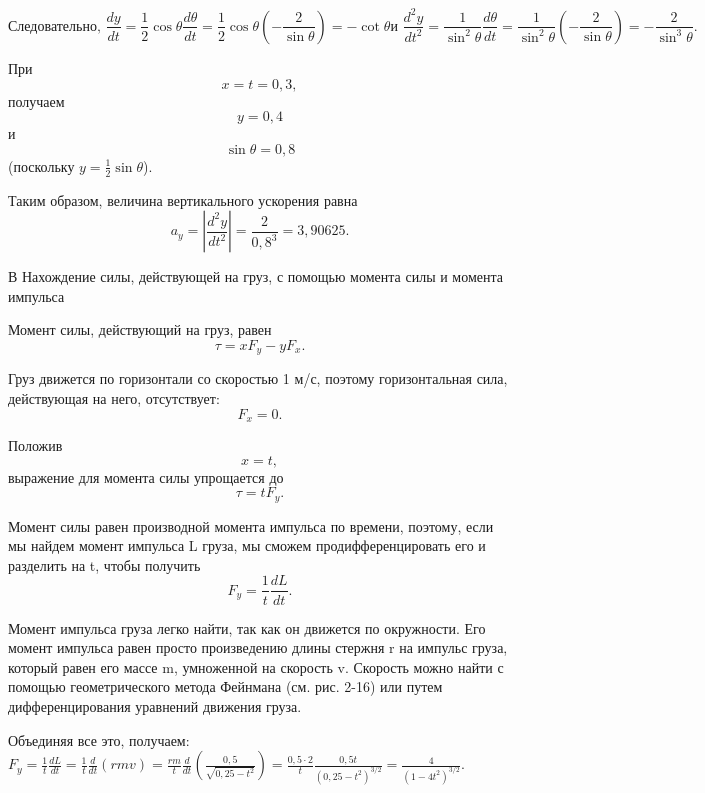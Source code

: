 \documentclass[10pt,oneside]{article}
\newcommand{\TipsRunning}[1]{\par\vspace{2bp}{\centering\footnotesize #1\par}\vspace{2bp}}
\begin{document}
\[\text{Следовательно, }\frac{dy}{dt} = \frac{1}{2} \cos\theta \frac{d\theta}{dt} = \frac{1}{2} \cos\theta \left(-\frac{2}{\sin\theta}\right) = -\cot\theta \text{и }\frac{d^2y}{dt^2} = \frac{1}{\sin^2\theta} \frac{d\theta}{dt} = \frac{1}{\sin^2\theta} \left(-\frac{2}{\sin\theta}\right) = -\frac{2}{\sin^3\theta}.\]

При \[x = t = 0,3,\] получаем \[y = 0,4\] и \[\sin\theta = 0,8\] (поскольку \(y = \frac{1}{2} \sin\theta\)).\par

Таким образом, величина вертикального ускорения равна \[a_y = \left| \frac{d^2y}{dt^2} \right| = \frac{2}{0,8^3} = 3,90625.\]\par

\TipsRunning{З А К О Н Ы  И  И Н Т У И Ц И Я • 8 9}

В Нахождение силы, действующей на груз, с помощью момента силы и момента импульса\par

Момент силы, действующий на груз, равен \[\tau = x F_y - y F_x.\]\par

Груз движется по горизонтали со скоростью 1 м/с, поэтому горизонтальная сила, действующая на него, отсутствует: \[F_x = 0.\]\par

Положив \[x = t,\] выражение для момента силы упрощается до \[\tau = t F_y.\]\par

Момент силы равен производной момента импульса по времени, поэтому, если мы найдем момент импульса L груза, мы сможем продифференцировать его и разделить на t, чтобы получить \[F_y = \frac{1}{t} \frac{dL}{dt}.\]\par

Момент импульса груза легко найти, так как он движется по окружности. Его момент импульса равен просто произведению длины стержня r на импульс груза, который равен его массе m, умноженной на скорость v. Скорость можно найти с помощью геометрического метода Фейнмана (см. рис. 2-16) или путем дифференцирования уравнений движения груза.\par

Объединяя все это, получаем: \(F_y = \frac{1}{t} \frac{dL}{dt} = \frac{1}{t} \frac{d}{dt}(rmv) = \frac{rm}{t} \frac{d}{dt}\left(\frac{0,5}{\sqrt{0,25 - t^2}}\right) = \frac{0,5 \cdot 2}{t} \frac{0,5 t}{(0,25 - t^2)^{3/2}} = \frac{4}{(1 - 4t^2)^{3/2}}.\)\par
\end{document}
